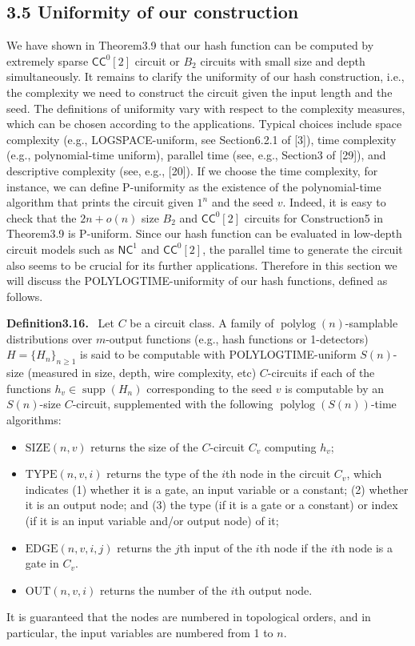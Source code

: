 \documentclass[10pt,a4paper]{article}
\newenvironment{authorclaim}[1]{\par\medskip\noindent\textbf{#1.}\ }{\par\medskip}
\begin{document}
\subsection*{3.5 Uniformity of our construction}
We have shown in Theorem3.9 that our hash function can be computed by extremely sparse $\mathsf{CC}^0[2]$ circuit or $B_2$ circuits with small size and depth simultaneously. It remains to clarify the uniformity of our hash construction, i.e., the complexity we need to construct the circuit given the input length and the seed.
The definitions of uniformity vary with respect to the complexity measures, which can be chosen according to the applications. Typical choices include space complexity (e.g., LOGSPACE-uniform, see Section6.2.1 of [3]), time complexity (e.g., polynomial-time uniform), parallel time (see, e.g., Section3 of [29]), and descriptive complexity (see, e.g., [20]). If we choose the time complexity, for instance, we can define P-uniformity as the existence of the polynomial-time algorithm that prints the circuit given $1^n$ and the seed $v$. Indeed, it is easy to check that the $2n+o(n)$ size $B_2$ and $\mathsf{CC}^0[2]$ circuits for Construction5 in Theorem3.9 is P-uniform.
Since our hash function can be evaluated in low-depth circuit models such as $\mathsf{NC}^1$ and $\mathsf{CC}^0[2]$, the parallel time to generate the circuit also seems to be crucial for its further applications. Therefore in this section we will discuss the POLYLOGTIME-uniformity of our hash functions, defined as follows.
\begin{authorclaim}{Definition3.16}
Let $C$ be a circuit class. A family of $\operatorname{polylog}(n)$-samplable distributions over $m$-output functions (e.g., hash functions or 1-detectors) $H=\{H_n\}_{n\ge1}$ is said to be computable with POLYLOGTIME-uniform $S(n)$-size (measured in size, depth, wire complexity, etc) $C$-circuits if each of the functions $h_v\in\operatorname{supp}(H_n)$ corresponding to the seed $v$ is computable by an $S(n)$-size $C$-circuit, supplemented with the following $\operatorname{polylog}(S(n))$-time algorithms:
\begin{itemize}
\item $\mathrm{SIZE}(n,v)$ returns the size of the $C$-circuit $C_v$ computing $h_v$;
\item $\mathrm{TYPE}(n,v,i)$ returns the type of the $i$th node in the circuit $C_v$, which indicates (1) whether it is a gate, an input variable or a constant; (2) whether it is an output node; and (3) the type (if it is a gate or a constant) or index (if it is an input variable and/or output node) of it;
\item $\mathrm{EDGE}(n,v,i,j)$ returns the $j$th input of the $i$th node if the $i$th node is a gate in $C_v$.
\item $\mathrm{OUT}(n,v,i)$ returns the number of the $i$th output node.
\end{itemize}
It is guaranteed that the nodes are numbered in topological orders, and in particular, the input variables are numbered from 1 to $n$.
\end{authorclaim}
\end{document}
